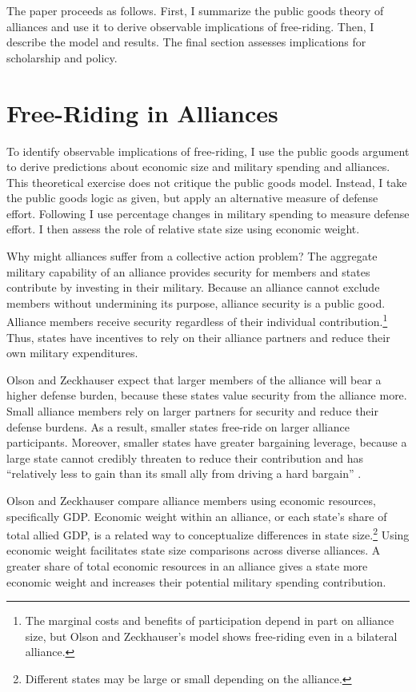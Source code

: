 \documentclass[12pt]{article}
\begin{document}
The paper proceeds as follows.
First, I summarize the public goods theory of alliances and use it to derive observable implications of free-riding.
Then, I describe the model and results. 
The final section assesses implications for scholarship and policy. 



\section{Free-Riding in Alliances}

To identify observable implications of free-riding, I use the public goods argument to derive predictions about economic size and military spending and alliances.
This theoretical exercise does not critique the public goods model.
Instead, I take the public goods logic as given, but apply an alternative measure of defense effort. 
Following \citet{PluemperNeumayer2015} I use percentage changes in military spending to measure defense effort.
I then assess the role of relative state size using economic weight. 


Why might alliances suffer from a collective action problem?
The aggregate military capability of an alliance provides security for members and states contribute by investing in their military.
Because an alliance cannot exclude members without undermining its purpose, alliance security is a public good. 
Alliance members receive security regardless of their individual contribution.\footnote{The marginal costs and benefits of participation depend in part on alliance size, but Olson and Zeckhauser's model shows free-riding even in a bilateral alliance.}
Thus, states have incentives to rely on their alliance partners and reduce their own military expenditures.  

 
Olson and Zeckhauser expect that larger members of the alliance will bear a higher defense burden, because these states value security from the alliance more.
Small alliance members rely on larger partners for security and reduce their defense burdens.
As a result, smaller states free-ride on larger alliance participants. 
Moreover, smaller states have greater bargaining leverage, because a large state cannot credibly threaten to reduce their contribution and has ``relatively less to gain than its small ally from driving a hard bargain'' \citep[pg. 274]{OlsonZeckhauser1966}. 


Olson and Zeckhauser compare alliance members using economic resources, specifically GDP.
Economic weight within an alliance, or each state's share of total allied GDP, is a related way to conceptualize differences in state size.\footnote{Different states may be large or small depending on the alliance.} 
Using economic weight facilitates state size comparisons across diverse alliances. 
A greater share of total economic resources in an alliance gives a state more economic weight and increases their potential military spending contribution. 
\end{document}
